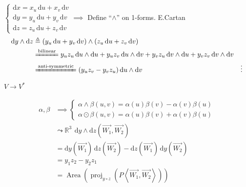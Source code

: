$\begin{cases}
        \mathrm{d}x=x_u\,\mathrm{d}u+x_v\,\mathrm{d}v \\
        \mathrm{d}y=y_u\,\mathrm{d}u+y_v\,\mathrm{d}v \\
        \mathrm{d}z=z_u\,\mathrm{d}u+z_v\,\mathrm{d}v
    \end{cases}\implies$ Define ``$\wedge$'' on 1-forms. E.Cartan
\begin{align*}
    \mathrm{d}y\wedge\mathrm{d}z
     & \triangleq(y_u\,\mathrm{d}u+y_v\,\mathrm{d}v)\wedge(z_u\,\mathrm{d}u+z_v\,\mathrm{d}v)                                                                                          \\
     & \xlongequal{\text{bilinear}}y_uz_u\,\mathrm{d}u\wedge\mathrm{d}u+y_uz_v\,\mathrm{d}u\wedge\mathrm{d}v+y_vz_u\,\mathrm{d}v\wedge\mathrm{d}u+y_vz_v\,\mathrm{d}v\wedge\mathrm{d}v \\
     & \xlongequal{\text{anti-symmetric}}(y_uz_v-y_vz_u)\,\mathrm{d}u\wedge\mathrm{d}v
     & \vdots
\end{align*}

$V\to V^*$

\begin{align*}
    \alpha,\beta
     & \implies\begin{cases}
                   \alpha\wedge\beta(u,v)=\alpha(u)\beta(v)-\alpha(v)\beta(u) \\
                   \alpha\odot\beta(u,v)=\alpha(u)\beta(v)+\alpha(v)\beta(u)
               \end{cases}                                                                                                                     \\
     & \leadsto\mathbb{R}^3\,\ \mathrm{d}y\wedge\mathrm{d}z\left(\overrightarrow{W_1},\overrightarrow{W_2}\right)                                                                             \\
     & =\mathrm{d}y\left(\overrightarrow{W_1}\right)\,\mathrm{d}z\left(\overrightarrow{W_2}\right)-\mathrm{d}z\left(\overrightarrow{W_1}\right)\,\mathrm{d}y\left(\overrightarrow{W_2}\right) \\
     & =y_1z_2-y_2z_1                                                                                                                                                                         \\
     & =\operatorname{Area}\left(\operatorname{proj}_{y\circ z}\left(P\left<\overrightarrow{W_1},\overrightarrow{W_2}\right>\right)\right)
\end{align*}

